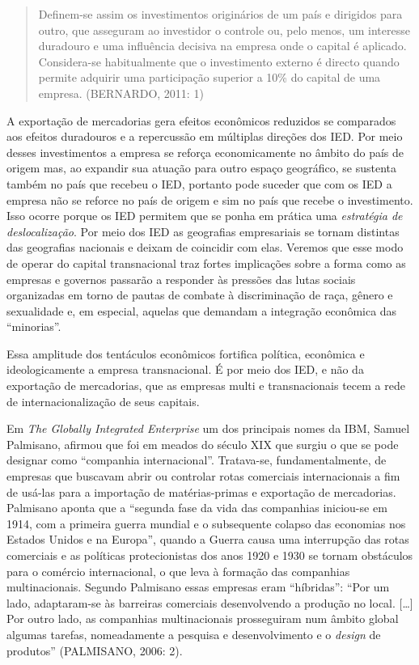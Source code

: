 \begin{quote}
Definem-se assim os investimentos originários de um país e dirigidos
para outro, que asseguram ao investidor o controle ou, pelo menos, um
interesse duradouro e uma influência decisiva na empresa onde o capital
é aplicado. Considera-se habitualmente que o investimento externo é
directo quando permite adquirir uma participação superior a 10\% do
capital de uma empresa. (BERNARDO, 2011: 1)
\end{quote}

A exportação de mercadorias gera efeitos econômicos reduzidos se
comparados aos efeitos duradouros e a repercussão em múltiplas direções
dos IED. Por meio desses investimentos a empresa se reforça
economicamente no âmbito do país de origem mas, ao expandir sua atuação
para outro espaço geográfico, se sustenta também no país que recebeu o
IED, portanto pode suceder que com os IED a empresa não se reforce no
país de origem e sim no país que recebe o investimento. Isso ocorre
porque os IED permitem que se ponha em prática uma \emph{estratégia de
deslocalização}. Por meio dos IED as geografias empresariais se tornam
distintas das geografias nacionais e deixam de coincidir com elas.
Veremos que esse modo de operar do capital transnacional traz fortes
implicações sobre a forma como as empresas e governos passarão a
responder às pressões das lutas sociais organizadas em torno de pautas
de combate à discriminação de raça, gênero e sexualidade e, em especial,
aquelas que demandam a integração econômica das ``minorias''.

Essa amplitude dos tentáculos econômicos fortifica política, econômica e
ideologicamente a empresa transnacional. É por meio dos IED, e não da
exportação de mercadorias, que as empresas multi e transnacionais tecem
a rede de internacionalização de seus capitais.

Em \emph{The Globally Integrated Enterprise} um dos principais nomes da
IBM, Samuel Palmisano, afirmou que foi em meados do século XIX que
surgiu o que se pode designar como ``companhia internacional''.
Tratava-se, fundamentalmente, de empresas que buscavam abrir ou
controlar rotas comerciais internacionais a fim de usá-las para a
importação de matérias-primas e exportação de mercadorias. Palmisano
aponta que a ``segunda fase da vida das companhias iniciou-se em 1914,
com a primeira guerra mundial e o subsequente colapso das economias nos
Estados Unidos e na Europa'', quando a Guerra causa uma interrupção das
rotas comerciais e as políticas protecionistas dos anos 1920 e 1930 se
tornam obstáculos para o comércio internacional, o que leva à formação
das companhias multinacionais. Segundo Palmisano essas empresas eram
``híbridas'': ``Por um lado, adaptaram-se às barreiras comerciais
desenvolvendo a produção no local. {[}\ldots{}{]} Por outro lado, as
companhias multinacionais prosseguiram num âmbito global algumas
tarefas, nomeadamente a pesquisa e desenvolvimento e o \emph{design} de
produtos'' (PALMISANO, 2006: 2).

